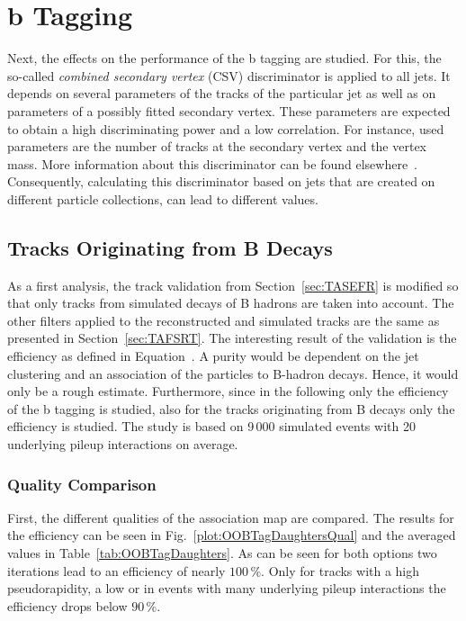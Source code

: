 \section{b Tagging \label{sec:OOBTag}}

Next, the effects on the performance of the b tagging are studied. For this, the so-called \textit{combined secondary vertex} (CSV) discriminator is applied to all jets. It depends on several parameters of the tracks of the particular jet as well as on parameters of a possibly fitted secondary vertex. These parameters are expected to obtain a high discriminating power and a low correlation. For instance, used parameters are the number of tracks at the secondary vertex and the vertex mass. More information about this discriminator can be found elsewhere~\cite{Chatrchyan:2012jua}. Consequently, calculating this discriminator based on jets that are created on different particle collections, can lead to different values.

\subsection{Tracks Originating from B Decays \label{sec:OOBTagDaughters}}

As a first analysis, the track validation from Section~\ref{sec:TASEFR} is modified so that only tracks from simulated decays of B hadrons are taken into account. The other filters applied to the reconstructed and simulated tracks are the same as presented in Section~\ref{sec:TAFSRT}. The interesting result of the validation is the efficiency as defined in Equation~. A purity would be dependent on the jet clustering and an association of the particles to B-hadron decays. Hence, it would only be a rough estimate. Furthermore, since in the following only the efficiency of the b tagging is studied, also for the tracks originating from B decays only the efficiency is studied. The study is based on 9\,000 simulated \ttbar events with 20 underlying pileup interactions on average.

\subsubsection{Quality Comparison \label{sec:OOBTagDaughtersQual}}

First, the different qualities of the association map are compared. The results for the efficiency can be seen in Fig.~\ref{plot:OOBTagDaughtersQual} and the averaged values in Table~\ref{tab:OOBTagDaughters}. As can be seen for both options two iterations lead to an efficiency of nearly $100\,\%$. Only for tracks with a high pseudorapidity, a low \pt or in events with many underlying pileup interactions the efficiency drops below $90\,\%$.

